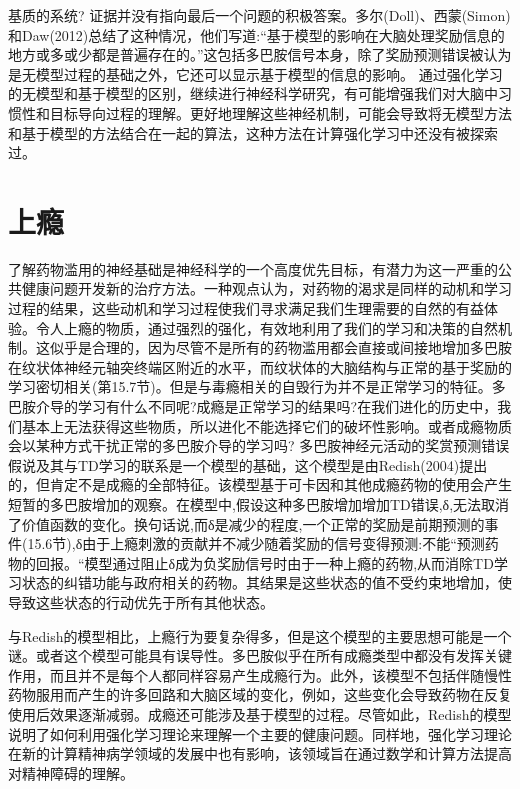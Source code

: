 基质的系统?
证据并没有指向最后一个问题的积极答案。多尔(Doll)、西蒙(Simon)和Daw(2012)总结了这种情况，他们写道:“基于模型的影响在大脑处理奖励信息的地方或多或少都是普遍存在的。”这包括多巴胺信号本身，除了奖励预测错误被认为是无模型过程的基础之外，它还可以显示基于模型的信息的影响。
通过强化学习的无模型和基于模型的区别，继续进行神经科学研究，有可能增强我们对大脑中习惯性和目标导向过程的理解。更好地理解这些神经机制，可能会导致将无模型方法和基于模型的方法结合在一起的算法，这种方法在计算强化学习中还没有被探索过。

\section{上瘾}

了解药物滥用的神经基础是神经科学的一个高度优先目标，有潜力为这一严重的公共健康问题开发新的治疗方法。一种观点认为，对药物的渴求是同样的动机和学习过程的结果，这些动机和学习过程使我们寻求满足我们生理需要的自然的有益体验。令人上瘾的物质，通过强烈的强化，有效地利用了我们的学习和决策的自然机制。这似乎是合理的，因为尽管不是所有的药物滥用都会直接或间接地增加多巴胺在纹状体神经元轴突终端区附近的水平，而纹状体的大脑结构与正常的基于奖励的学习密切相关(第15.7节)。但是与毒瘾相关的自毁行为并不是正常学习的特征。多巴胺介导的学习有什么不同呢?成瘾是正常学习的结果吗?在我们进化的历史中，我们基本上无法获得这些物质，所以进化不能选择它们的破坏性影响。或者成瘾物质会以某种方式干扰正常的多巴胺介导的学习吗?
多巴胺神经元活动的奖赏预测错误假说及其与TD学习的联系是一个模型的基础，这个模型是由Redish(2004)提出的，但肯定不是成瘾的全部特征。该模型基于可卡因和其他成瘾药物的使用会产生短暂的多巴胺增加的观察。在模型中,假设这种多巴胺增加增加TD错误,δ,无法取消了价值函数的变化。换句话说,而δ是减少的程度,一个正常的奖励是前期预测的事件(15.6节),δ由于上瘾刺激的贡献并不减少随着奖励的信号变得预测:不能“预测药物的回报。“模型通过阻止δ成为负奖励信号时由于一种上瘾的药物,从而消除TD学习状态的纠错功能与政府相关的药物。其结果是这些状态的值不受约束地增加，使导致这些状态的行动优先于所有其他状态。

与Redish的模型相比，上瘾行为要复杂得多，但是这个模型的主要思想可能是一个谜。或者这个模型可能具有误导性。多巴胺似乎在所有成瘾类型中都没有发挥关键作用，而且并不是每个人都同样容易产生成瘾行为。此外，该模型不包括伴随慢性药物服用而产生的许多回路和大脑区域的变化，例如，这些变化会导致药物在反复使用后效果逐渐减弱。成瘾还可能涉及基于模型的过程。尽管如此，Redish的模型说明了如何利用强化学习理论来理解一个主要的健康问题。同样地，强化学习理论在新的计算精神病学领域的发展中也有影响，该领域旨在通过数学和计算方法提高对精神障碍的理解。

